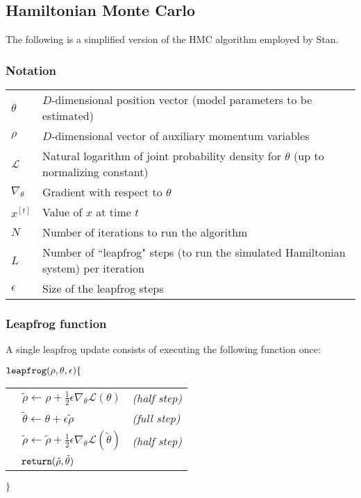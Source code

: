 \clearpage
\label{AppendixD}
\vspace{-1.75cm}
\subsection{Hamiltonian Monte Carlo}

\noindent The following is a simplified version of the HMC algorithm employed by Stan. 

{\singlespacing
\subsubsection{Notation}

\begin{tabular}{ll}
$\theta$ & $D$-dimensional position vector (model parameters to be estimated) \\

 $ \rho$ & $D$-dimensional vector of auxiliary momentum variables \\

$\mathcal{L}$ & Natural logarithm of joint probability density for $\theta$ (up to normalizing constant) \\

$\nabla_\theta$ & Gradient with respect to $\theta$ \\

$x^{[t]}$ & Value of $x$ at time $t$ \\

$N$ & Number of iterations to run the algorithm \\

$L$ & Number of ``leapfrog" steps (to run the simulated Hamiltonian system) per iteration\\

$\epsilon$ & Size of the leapfrog steps
\end{tabular}
}


\subsubsection{Leapfrog function}

\noindent A single leapfrog update consists of executing the following function once:

{\singlespacing

${\tt leapfrog} (\rho, \theta, \epsilon) \{$ 

\begin{tabular}{ll}
$\quad \tilde{\rho} \leftarrow \rho + \tfrac{1}{2}\epsilon \nabla_\theta \mathcal{L}(\theta)$ & {\it (half step)} \\

$\quad \tilde{\theta} \leftarrow \theta + \epsilon \tilde{\rho}$ & {\it (full step)} \\

$\quad \tilde{\rho} \leftarrow \tilde{\rho} + \tfrac{1}{2}\epsilon \nabla_\theta \mathcal{L}(\tilde{\theta})$ & {\it (half step)} \\

$\quad {\tt return} (\tilde{\rho}, \tilde{\theta})$
\end{tabular}

$\}$

}

